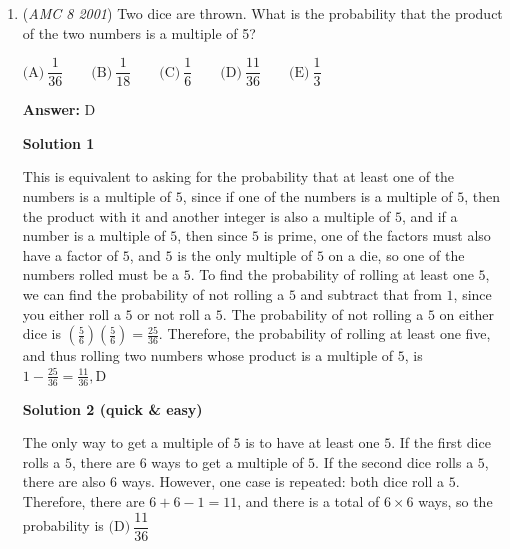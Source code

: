 \begin{enumerate}
 \textbf{Answer: }B



\textbf{Solution}

Notice that in two of the increases, the dollar amount doubles. The increases in which this is not true is $2$ to $3$, $3$ to $4$, and $11$ to $12$. We can disregard $11$ to $12$ since that increase is almost $2$ times. The increase from $2$ to $3$ is $\frac{300-200}{200}=\frac{1}{2}$, so it's only multiplied by a factor of $1.5$. The increase from $3$ to $4$ is $\frac{500-300}{300}=\frac{2}{3}$, so it is multiplied by a factor of $1.\bar{6}$. Therefore, the smallest percent increase is $\text{From 2 to 3}, \boxed{\text{B}}$



	\item (\textit{AMC 8 2001}) Two dice are thrown. What is the probability that the product of the two numbers is a multiple of 5?


 $\text{(A)}\ \dfrac{1}{36} \qquad \text{(B)}\ \dfrac{1}{18} \qquad \text{(C)}\ \dfrac{1}{6} \qquad \text{(D)}\ \dfrac{11}{36} \qquad \text{(E)}\ \dfrac{1}{3}$

 \textbf{Answer: }D



\textbf{Solution 1}

This is equivalent to asking for the probability that at least one of the numbers is a multiple of $5$, since if one of the numbers is a multiple of $5$, then the product with it and another integer is also a multiple of $5$, and if a number is a multiple of $5$, then since $5$ is prime, one of the factors must also have a factor of $5$, and $5$ is the only multiple of $5$ on a die, so one of the numbers rolled must be a $5$. To find the probability of rolling at least one $5$, we can find the probability of not rolling a $5$ and subtract that from $1$, since you either roll a $5$ or not roll a $5$. The probability of not rolling a $5$ on either dice is $\left(\frac{5}{6} \right) \left(\frac{5}{6} \right)=\frac{25}{36}$. Therefore, the probability of rolling at least one five, and thus rolling two numbers whose product is a multiple of $5$, is $1-\frac{25}{36}=\frac{11}{36}, \boxed{\text{D}}$




\textbf{Solution 2 (quick & easy)}

The only way to get a multiple of $5$ is to have at least one $5$. If the first dice rolls a $5$,  there are $6$ ways to get a multiple of $5$. If the second dice rolls a $5$, there are also $6$ ways. However, one case is repeated: both dice roll a $5$. Therefore, there are $6 + 6 - 1 = 11$, and there is a total of $6 \times 6$ ways, so the probability is $\text{(D)}\ \dfrac{11}{36}$


\end{enumerate}
